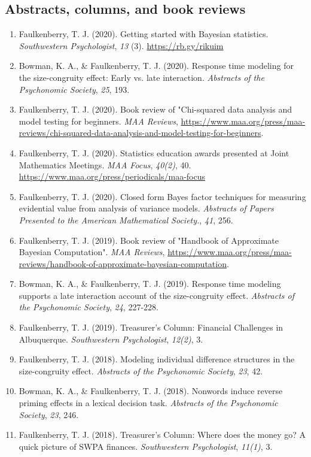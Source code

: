 \documentclass[article,10pt]{article}
\begin{document}
\subsection*{Abstracts, columns, and book reviews}
\label{sec:org371f89e}
\begin{enumerate}
\item Faulkenberry, T. J. (2020). Getting started with Bayesian statistics. \emph{Southwestern Psychologist}, \emph{13} (3). \url{https://rb.gy/rikuim}
\item Bowman, K. A., \& Faulkenberry, T. J. (2020). Response time modeling for the size-congruity effect: Early vs. late interaction. \emph{Abstracts of the Psychonomic Society}, \emph{25}, 193.
\item Faulkenberry, T. J. (2020). Book review of "Chi-squared data analysis and model testing for beginners. \emph{MAA Reviews}, \url{https://www.maa.org/press/maa-reviews/chi-squared-data-analysis-and-model-testing-for-beginners}.
\item Faulkenberry, T. J. (2020). Statistics education awards presented at Joint Mathematics Meetings. \emph{MAA Focus}, \emph{40(2)}, 40. \url{https://www.maa.org/press/periodicals/maa-focus}
\item Faulkenberry, T. J. (2020). Closed form Bayes factor techniques for measuring evidential value from analysis of variance models. \emph{Abstracts of Papers Presented to the American Mathematical Society.}, \emph{41}, 256.
\item Faulkenberry, T. J. (2019). Book review of "Handbook of Approximate Bayesian Computation". \emph{MAA Reviews}, \url{https://www.maa.org/press/maa-reviews/handbook-of-approximate-bayesian-computation}.
\item Bowman, K. A., \& Faulkenberry, T. J. (2019). Response time modeling supports a late interaction account of the size-congruity effect. \emph{Abstracts of the Psychonomic Society}, \emph{24}, 227-228.
\item Faulkenberry, T. J. (2019). Treasurer's Column: Financial Challenges in Albuquerque. \emph{Southwestern Psychologist}, \emph{12(2)}, 3.
\item Faulkenberry, T. J. (2018). Modeling individual difference structures in the size-congruity effect. \emph{Abstracts of the Psychonomic Society}, \emph{23}, 42.
\item Bowman, K. A., \& Faulkenberry, T. J. (2018). Nonwords induce reverse priming effects in a lexical decision task. \emph{Abstracts of the Psychonomic Society}, \emph{23}, 246.
\item Faulkenberry, T. J. (2018). Treasurer's Column: Where does the money go? A quick picture of SWPA finances. \emph{Southwestern Psychologist}, \emph{11(1)}, 3.

\end{enumerate}
\end{document}
